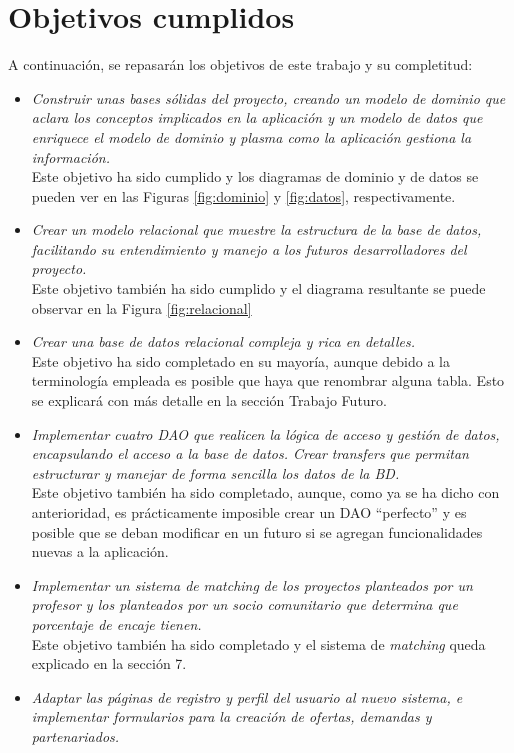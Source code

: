 \documentclass[11pt]{book}
\begin{document}
	\section{Objetivos cumplidos}
	A continuación, se repasarán los objetivos de este trabajo y su completitud:
	\begin{itemize}
		\item \emph{Construir unas bases sólidas del proyecto, creando un modelo de dominio que aclara los conceptos implicados en la aplicación y un modelo de datos que enriquece el modelo de dominio y plasma como la aplicación gestiona la información.}\\
		Este objetivo ha sido cumplido y los diagramas de dominio y de datos se pueden ver en las Figuras \ref{fig:dominio} y \ref{fig:datos}, respectivamente.
		\item \emph{Crear un modelo relacional que muestre la estructura de la base de datos, facilitando su entendimiento y manejo a los futuros desarrolladores del proyecto.}\\
		Este objetivo también ha sido cumplido y el diagrama resultante se puede observar en la Figura \ref{fig:relacional}
		\item \emph{Crear una base de datos relacional compleja y rica en detalles.} \\
		Este objetivo ha sido completado en su mayoría, aunque debido a la terminología empleada es posible que haya que renombrar alguna tabla. Esto se explicará con más detalle en la sección Trabajo Futuro.
		\item \emph{Implementar cuatro DAO que realicen la lógica de acceso y gestión de datos, encapsulando el acceso a la base de datos. Crear }\emph{transfers} \emph{que permitan estructurar y manejar de forma sencilla los datos de la BD.} \\
		Este objetivo también ha sido completado, aunque, como ya se ha dicho con anterioridad, es prácticamente imposible crear un DAO ``perfecto'' y es posible que se deban modificar en un futuro si se agregan funcionalidades nuevas a la aplicación.
		\item \emph{Implementar un sistema de} \emph{matching} \emph{de los proyectos planteados por un profesor y los planteados por un socio comunitario que determina que porcentaje de encaje tienen.} \\
		Este objetivo también ha sido completado y el sistema de \emph{matching} queda explicado en la sección 7.
		\item \emph{Adaptar las páginas de registro y perfil del usuario al nuevo sistema, e implementar formularios para la creación de ofertas, demandas y partenariados.} \\

\end{itemize}
\end{document}
